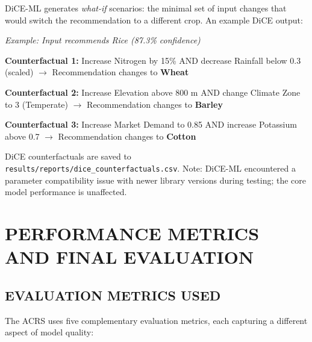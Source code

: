 \documentclass[12pt,a4paper,oneside]{report}
\begin{document}
DiCE-ML generates \textit{what-if} scenarios: the minimal set of input changes that would switch the recommendation to a different crop. An example DiCE output:

\vspace{0.3cm}
\begin{singlespacing}
\noindent\textit{Example: Input recommends Rice (87.3\% confidence)}

\noindent\textbf{Counterfactual 1:} Increase Nitrogen by 15\% AND decrease Rainfall below 0.3 (scaled) $\rightarrow$ Recommendation changes to \textbf{Wheat}

\noindent\textbf{Counterfactual 2:} Increase Elevation above 800 m AND change Climate Zone to 3 (Temperate) $\rightarrow$ Recommendation changes to \textbf{Barley}

\noindent\textbf{Counterfactual 3:} Increase Market Demand to 0.85 AND increase Potassium above 0.7 $\rightarrow$ Recommendation changes to \textbf{Cotton}
\end{singlespacing}
\vspace{0.3cm}

DiCE counterfactuals are saved to \texttt{results/reports/dice\_counterfactuals.csv}. Note: DiCE-ML encountered a parameter compatibility issue with newer library versions during testing; the core model performance is unaffected.

\chapter{PERFORMANCE METRICS AND FINAL EVALUATION}

\section{EVALUATION METRICS USED}

The ACRS uses five complementary evaluation metrics, each capturing a different aspect of model quality:
\end{document}
